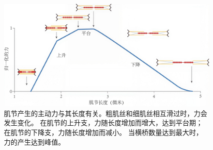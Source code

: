\begin{figure}[!htb]
	\centering
	\includegraphics[width=0.5\linewidth]{chap4/4_6}
	\caption{肌节产生的主动力与其长度有关。粗肌丝和细肌丝相互滑过时，力会发生变化。
		在肌节的上升支，力随长度增加而增大，达到平台期；
		在肌节的下降支，力随长度增加而减小。
		当横桥数量达到最大时，力的产生达到峰值\cite{gordon1966variation}。 \label{fig:4_6}}
\end{figure}




